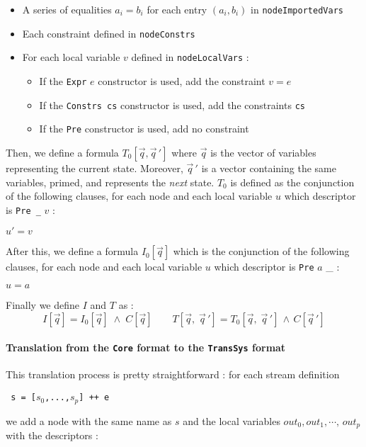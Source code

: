 \begin{itemize}
\item A series of equalities $a_i = b_i$ for each entry $(a_i, b_i)$ in \texttt{nodeImportedVars}
\item Each constraint defined in \texttt{nodeConstrs}
\item For each local variable $v$ defined in \texttt{nodeLocalVars} :

\begin{itemize}
\item If the \texttt{Expr} $e$ constructor is used, add the constraint $v = e$
\item If the \texttt{Constrs cs} constructor is used, add the constraints \texttt{cs} 
\item If the \texttt{Pre} constructor is used, add no constraint
\end{itemize}

\end{itemize}


Then, we define a formula $T_0[\vec q, \vec q \,']$ where $\vec q$ is the vector of variables representing the current state. Moreover, $\vec q \,'$ is a vector containing the same variables, primed, and represents the \textit{next} state. $T_0$ is defined as the conjunction of the following clauses, for each node and each local variable $u$ which descriptor is \texttt{Pre \_} $v$ :
\begin{center} $u' = v$ \end{center}
After this, we define a formula $I_0[\vec q]$ which is the conjunction of the following clauses, for each node and each local variable $u$ which descriptor is \texttt{Pre} $a$ \_ :
\begin{center} $u = a$ \end{center}
Finally we define $I$ and $T$ as :
\[  I[\vec q] =  I_0[\vec q] \;\wedge\; C[\vec q] \qquad T[\vec q, \; \vec q \, '] = T_0[\vec q, \; \vec q \,'] \, \wedge \, C[\vec q \, ']  \]




\paragraph{Translation from the \texttt{Core} format to the \texttt{TransSys} format}

This translation process is pretty straightforward : for each stream definition
\begin{center}\texttt{ s = [$s_0$,...,$s_p$] ++ e}\end{center}
we add a node with the same name as $s$ and the local variables $out_0, out_1, \cdots, \, out_p$ with the descriptors :

